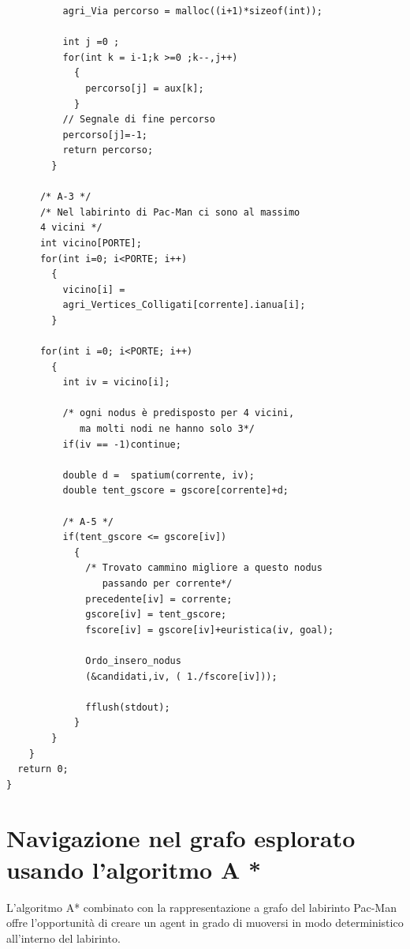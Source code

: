 \documentclass[8pt]{book}
\begin{document}
\begin{spacing}{0.85}
  \begin{small}
\begin{tcolorbox}
\begin{verbatim}	  
          agri_Via percorso = malloc((i+1)*sizeof(int));
	  
          int j =0 ;
          for(int k = i-1;k >=0 ;k--,j++)
            {
              percorso[j] = aux[k];
            }
          // Segnale di fine percorso
          percorso[j]=-1;
          return percorso;
        }
     
      /* A-3 */
      /* Nel labirinto di Pac-Man ci sono al massimo 
      4 vicini */
      int vicino[PORTE];
      for(int i=0; i<PORTE; i++)
        {
          vicino[i] = 
          agri_Vertices_Colligati[corrente].ianua[i];
        }
      
      for(int i =0; i<PORTE; i++)
        {
          int iv = vicino[i];
	  
          /* ogni nodus è predisposto per 4 vicini, 
             ma molti nodi ne hanno solo 3*/
          if(iv == -1)continue;
	  
          double d =  spatium(corrente, iv);
          double tent_gscore = gscore[corrente]+d;
	  
          /* A-5 */
          if(tent_gscore <= gscore[iv])
            {
              /* Trovato cammino migliore a questo nodus 
                 passando per corrente*/
              precedente[iv] = corrente;
              gscore[iv] = tent_gscore;
              fscore[iv] = gscore[iv]+euristica(iv, goal);
	      
              Ordo_insero_nodus
              (&candidati,iv, ( 1./fscore[iv]));
	      
              fflush(stdout);
            }
        }
    }
  return 0;
}
\end{verbatim}
    \end{tcolorbox}
  \end{small}
\end{spacing}


\section[L'algoritmo A*]{Navigazione nel grafo esplorato usando l'algoritmo A *}

L'algoritmo A* combinato con la rappresentazione a grafo del labirinto Pac-Man offre l'opportunità di creare un agent in grado di muoversi in modo deterministico all'interno del labirinto.\\
\end{document}
